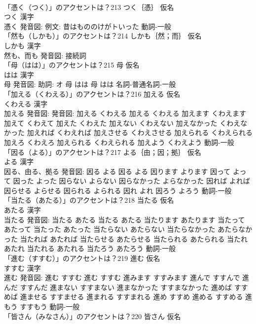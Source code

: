 \documentclass[8pt]{extreport}
\begin{document}
\begin{CJK}{UTF8}{min}
\\	「憑く（つく）」のアクセントは？213	つく｛憑｝ 仮名　
\\	つく 漢字　
\\	憑く 発音図: 例文: 昔はもののけがトいった							動詞-一般 
\\	「然も（しかも）」のアクセントは？214	しかも｛然；而｝ 仮名　
\\	しかも 漢字　
\\	然も、而も 発音図:							接続詞 
\\	「母（はは）」のアクセントは？215	母 仮名　
\\	はは 漢字　
\\	母 発音図: 助詞: オ	母 はは		母 はは				名詞-普通名詞-一般 
\\	「加える（くわえる）」のアクセントは？216	加える 仮名　
\\	くわえる 漢字　
\\	加える 発音図: 発音図:	加える くわえる		加える くわえる 加えます くわえます 加えて くわえて 加えた くわえた 加えない くわえない 加えなかった くわえなかった 加えれば くわえれば 加えさせる くわえさせる 加えられる くわえられる 加えろ くわえろ 加えられる くわえられる 加えよう くわえよう				動詞-一般 
\\	「因る（よる）」のアクセントは？217	よる｛由；因；拠｝ 仮名　
\\	よる 漢字　
\\	因る、由る、拠る 発音図:	因る よる		因る よる 因ります よります 因って よって 因った よった 因らない よらない 因らなかった よらなかった 因れば よれば 因らせる よらせる 因られる よられる 因れ よれ 因ろう よろう				動詞-一般 
\\	「当たる（あたる）」のアクセントは？218	当たる 仮名　
\\	あたる 漢字　
\\	当たる 発音図:	当たる あたる		当たる あたる 当たります あたります 当たって あたって 当たった あたった 当たらない あたらない 当たらなかった あたらなかった 当たれば あたれば 当たらせる あたらせる 当たられる あたられる 当たれ あたれ 当たれる あたれる 当たろう あたろう				動詞-一般 
\\	「進む（すすむ）」のアクセントは？219	進む 仮名　
\\	すすむ 漢字　
\\	進む 発音図:	進む すすむ		進む すすむ 進みます すすみます 進んで すすんで 進んだ すすんだ 進まない すすまない 進まなかった すすまなかった 進めば すすめば 進ませる すすませる 進まれる すすまれる 進め すすめ 進める すすめる 進もう すすもう				動詞-一般 
\\	「皆さん（みなさん）」のアクセントは？220	皆さん 仮名　

\end{CJK}
\end{document}
